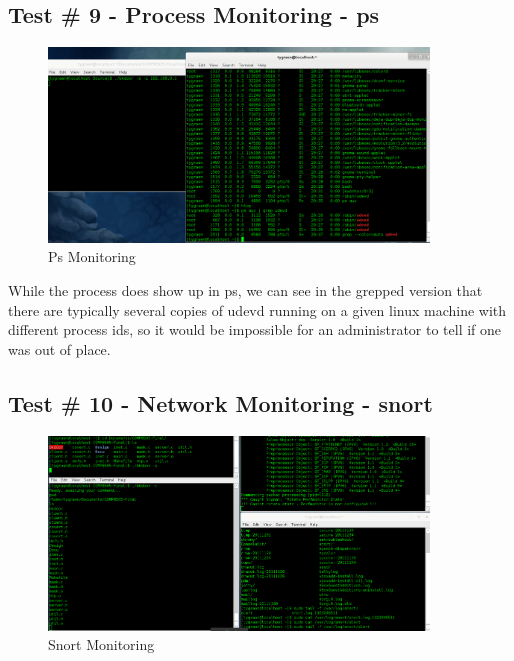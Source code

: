\documentclass[titlepage]{article}
\begin{document}
\clearpage

\subsection{Test \# 9 - Process Monitoring - ps}

\begin{figure}[htb]                                                                       
  \begin{center}
    \includegraphics[width=0.9\textwidth]{Pictures/ps.png}
  \end{center}
  \caption{Ps Monitoring}
  \label{fig:ps}
\end{figure}

While the process does show up in ps, we can see in the grepped version that there are typically several copies of udevd running on a given linux machine with different process ids, so it would be impossible for an administrator to tell if one was out of place.  

\clearpage

\subsection{Test \# 10 - Network Monitoring - snort}

\begin{figure}[htb]                                                                       
  \begin{center}
    \includegraphics[width=0.9\textwidth]{Pictures/snort.png}
  \end{center}
  \caption{Snort Monitoring}
  \label{fig:snort}
\end{figure}
\end{document}
